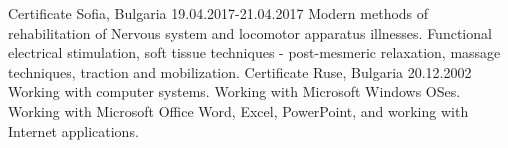 \cventry
{Certificate}
{Sofia, Bulgaria 19.04.2017-21.04.2017}
{
Modern methods of rehabilitation of Nervous system and locomotor apparatus illnesses. Functional electrical stimulation, soft tissue techniques - post-mesmeric relaxation, massage techniques,  traction and mobilization.
}
\vspace{+3mm}
\cventry
{Certificate}
{Ruse, Bulgaria 20.12.2002}
{
Working with computer systems. Working with Microsoft Windows OSes. Working with Microsoft Office Word, Excel, PowerPoint, and working with Internet applications. 
}
